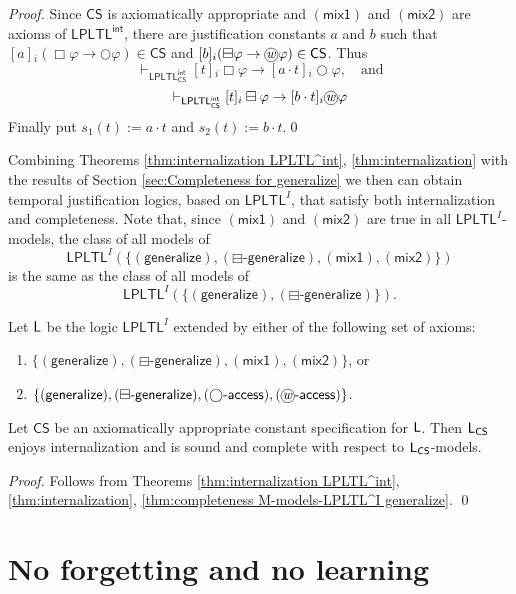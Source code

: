 \documentclass[envcountsect,envcountsame,oribibl,orivec]{llncs}
\newcommand*\circled[1]{\tikz[baseline=(char.base)]{
		\node[shape=circle,draw,inner sep=0.4pt] (char) {#1};}}
\newcommand{\limplies}{\rightarrow}
\newcommand{\lnext}{\bigcirc}
\newcommand{\lalways}{\Box}
\newcommand{\lsofar}{\boxminus}
\newcommand{\wprevious}{\circled{\textit{w}}}
\newcommand{\mixaxone}{\ensuremath{(\textsf{mix1})}}
\newcommand{\mixaxtwo}{\ensuremath{(\textsf{mix2})}}
\newcommand{\LPLTL}{\textsf{LPLTL}}
\newcommand{\jbox}[1]{\left[#1\right]\!}
\newcommand{\CS}{\textsf{CS}}
\newcommand{\agent}{i}
\newcommand{\generalizeprinciple}{\ensuremath{(\textsf{generalize})}}
\newcommand{\nextaccessprinciple}{\ensuremath{(\lnext\textsf{-access})}}
\newcommand{\pastgeneralizeprinciple}{\ensuremath{(\lsofar\textsf{-generalize})}}
\newcommand{\wprevaccessprinciple}{\ensuremath{(\wprevious\textsf{-access})}}
\renewcommand{\phi}{\varphi}
\begin{document}
\begin{proof}
	Since $\CS$ is axiomatically appropriate and $\mixaxone$ and $\mixaxtwo$ are axioms of $\LPLTL^\mathsf{int}$, there are justification constants $a$ and $b$ such that $\jbox{a}_i (\lalways \phi \to \lnext \phi) \in \CS$ and  $\jbox{b}_i (\lsofar \phi \to \wprevious \phi) \in \CS$. Thus 
	\[
	\vdash_{\LPLTL^\mathsf{int}_\CS} \jbox{t}_\agent \lalways \phi \limplies \jbox{a \cdot t}_\agent \lnext \phi, \quad \mbox{and}
	\]
	\[
	\vdash_{\LPLTL^\mathsf{int}_\CS} \jbox{t}_\agent \lsofar \phi \limplies \jbox{b \cdot t}_\agent \wprevious \phi
	\]
	Finally put $s_1(t) := a \cdot t$ and $s_2(t) := b \cdot t$.\qed
\end{proof}


Combining Theorems \ref{thm:internalization LPLTL^int}, \ref{thm:internalization} with the results of Section \ref{sec:Completeness for generalize}  we then can obtain temporal justification logics, based on $\LPLTL^I$, that satisfy both internalization and completeness. Note that, since $\mixaxone$ and $\mixaxtwo$ are true in all $\LPLTL^I$-models, the class of all models of $$\LPLTL^I (\{\generalizeprinciple, \pastgeneralizeprinciple, \mixaxone, \mixaxtwo\})$$ is the same as the class of all models of $$\LPLTL^I(\{\generalizeprinciple, \pastgeneralizeprinciple\}).$$

\begin{theorem}\label{thm:completeness and internalization}
	Let ${\sf L}$ be the logic $\LPLTL^I$ extended by either of the following set of axioms:
	\begin{enumerate}
		\item $\{\generalizeprinciple, \pastgeneralizeprinciple, \mixaxone, \mixaxtwo\}$, or
		
		\item $\{ \generalizeprinciple, \pastgeneralizeprinciple, \nextaccessprinciple, \wprevaccessprinciple \}$.
	\end{enumerate}
	Let $\CS$ be an axiomatically appropriate constant specification for ${\sf L}$.	Then ${\sf L}_\CS$ enjoys internalization and is sound and complete with respect to ${\sf L}_\CS$-models.
\end{theorem}
\begin{proof}
	Follows from Theorems \ref{thm:internalization LPLTL^int}, \ref{thm:internalization}, \ref{thm:completeness M-models-LPLTL^I generalize}. \qed
\end{proof}
\section{No forgetting and no learning}
\label{sec:No forgetting and no learning}
\end{document}
